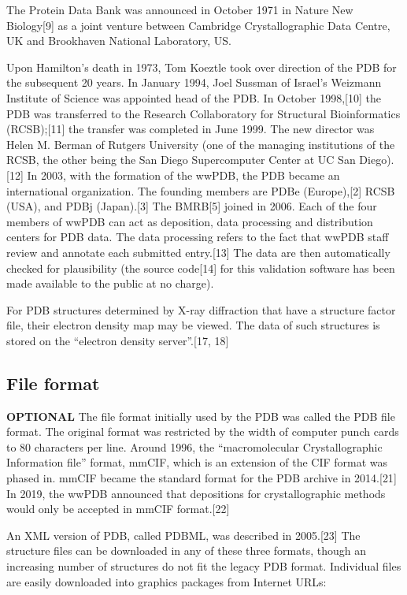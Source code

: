 \documentclass[
]{book}
\begin{document}
The Protein Data Bank was announced in October 1971 in Nature New Biology{[}9{]} as a joint venture between Cambridge Crystallographic Data Centre, UK and Brookhaven National Laboratory, US.

Upon Hamilton's death in 1973, Tom Koeztle took over direction of the PDB for the subsequent 20 years. In January 1994, Joel Sussman of Israel's Weizmann Institute of Science was appointed head of the PDB. In October 1998,{[}10{]} the PDB was transferred to the Research Collaboratory for Structural Bioinformatics (RCSB);{[}11{]} the transfer was completed in June 1999. The new director was Helen M. Berman of Rutgers University (one of the managing institutions of the RCSB, the other being the San Diego Supercomputer Center at UC San Diego).{[}12{]} In 2003, with the formation of the wwPDB, the PDB became an international organization. The founding members are PDBe (Europe),{[}2{]} RCSB (USA), and PDBj (Japan).{[}3{]} The BMRB{[}5{]} joined in 2006. Each of the four members of wwPDB can act as deposition, data processing and distribution centers for PDB data. The data processing refers to the fact that wwPDB staff review and annotate each submitted entry.{[}13{]} The data are then automatically checked for plausibility (the source code{[}14{]} for this validation software has been made available to the public at no charge).

For PDB structures determined by X-ray diffraction that have a structure factor file, their electron density map may be viewed. The data of such structures is stored on the ``electron density server''.{[}17, 18{]}

\hypertarget{file-format}{%
\subsection{File format}\label{file-format}}

\textbf{OPTIONAL}
The file format initially used by the PDB was called the PDB file format. The original format was restricted by the width of computer punch cards to 80 characters per line. Around 1996, the ``macromolecular Crystallographic Information file'' format, mmCIF, which is an extension of the CIF format was phased in. mmCIF became the standard format for the PDB archive in 2014.{[}21{]} In 2019, the wwPDB announced that depositions for crystallographic methods would only be accepted in mmCIF format.{[}22{]}

An XML version of PDB, called PDBML, was described in 2005.{[}23{]} The structure files can be downloaded in any of these three formats, though an increasing number of structures do not fit the legacy PDB format. Individual files are easily downloaded into graphics packages from Internet URLs:
\end{document}
